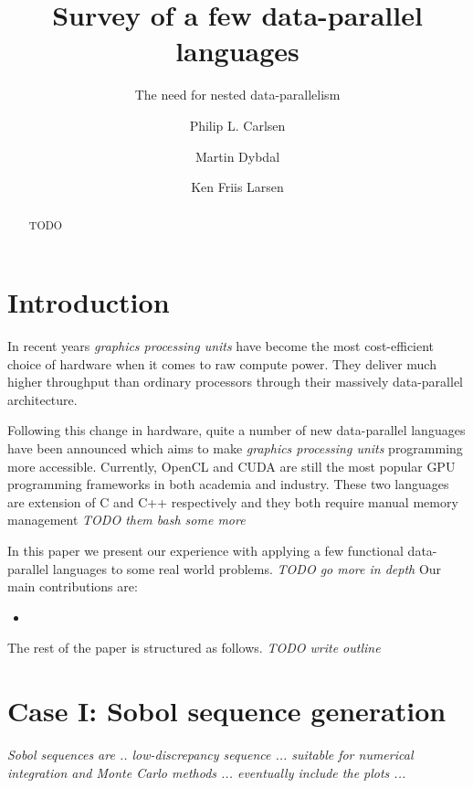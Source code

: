 \documentclass{llncs2e/llncs}
\title{Survey of a few data-parallel languages}
\subtitle{The need for nested data-parallelism} \author{Philip L. Carlsen \and Martin Dybdal \and Ken Friis Larsen}
\institute{University of Copenhagen \\ \email{plcplc@gmail.com,
    dybber@dybber.dk, kflarsen@diku.dk}}
\begin{document}
\maketitle

\begin{abstract}
  TODO
\end{abstract}

\section{Introduction}
In recent years \emph{graphics processing units} have become the most
cost-efficient choice of hardware when it comes to raw compute
power. They deliver much higher throughput than ordinary processors
through their massively data-parallel architecture.

Following this change in hardware, quite a number of new data-parallel
languages \cite{} have been announced which aims to make
\emph{graphics processing units} programming more
accessible. Currently, OpenCL and CUDA are still the most popular GPU
programming frameworks in both academia and industry. These two
languages are extension of C and C++ respectively and they both
require manual memory management \emph{TODO them bash some more}

In this paper we present our experience with applying a few functional
data-parallel languages to some real world problems. \emph{TODO go
  more in depth} Our main contributions are:
\begin{itemize}
\item 
\end{itemize}


The rest of the paper is structured as follows. \emph{TODO write outline}


\section{Case I: Sobol sequence generation}
\emph{Sobol sequences are .. low-discrepancy sequence ... suitable for
numerical integration and Monte Carlo methods ... eventually include
the plots ...}
\end{document}
